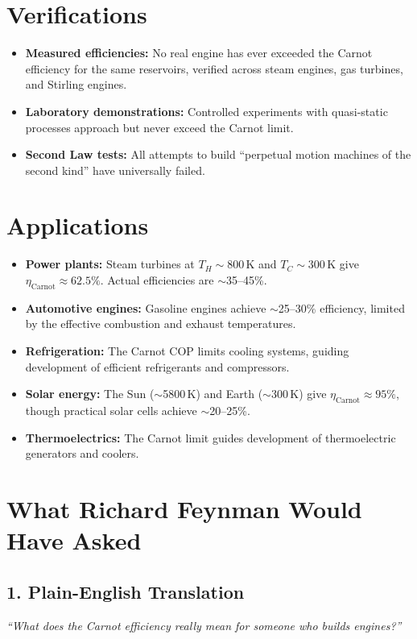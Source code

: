 \documentclass[11pt,openright]{book}
\begin{document}
\section*{Verifications}

\begin{itemize}
\item \textbf{Measured efficiencies:} No real engine has ever exceeded the Carnot efficiency for the same reservoirs, verified across steam engines, gas turbines, and Stirling engines.
\item \textbf{Laboratory demonstrations:} Controlled experiments with quasi-static processes approach but never exceed the Carnot limit.
\item \textbf{Second Law tests:} All attempts to build ``perpetual motion machines of the second kind'' have universally failed.
\end{itemize}
\section*{Applications}

\begin{itemize}
\item \textbf{Power plants:} Steam turbines at $T_H \sim 800$\,K and $T_C \sim 300$\,K give $\eta_{\text{Carnot}} \approx 62.5\%$. Actual efficiencies are $\sim$35--45\%.
\item \textbf{Automotive engines:} Gasoline engines achieve $\sim$25--30\% efficiency, limited by the effective combustion and exhaust temperatures.
\item \textbf{Refrigeration:} The Carnot COP limits cooling systems, guiding development of efficient refrigerants and compressors.
\item \textbf{Solar energy:} The Sun ($\sim$5800\,K) and Earth ($\sim$300\,K) give $\eta_{\text{Carnot}} \approx 95\%$, though practical solar cells achieve $\sim$20--25\%.
\item \textbf{Thermoelectrics:} The Carnot limit guides development of thermoelectric generators and coolers.
\end{itemize}
\section*{What Richard Feynman Would Have Asked}

\subsection*{1. Plain-English Translation}
\textit{``What does the Carnot efficiency really mean for someone who builds engines?''}
\end{document}
